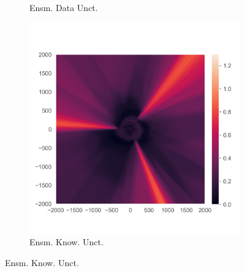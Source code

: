 \begin{figure}
\begin{subfigure}{0.22\textwidth}
  \caption{Ensm. Data Unct.}
  \label{fig:3b}
\end{subfigure}
\begin{subfigure}{0.22\textwidth}
  \centering
  \includegraphics[trim=42 45 15 55, clip, width=\linewidth]{../openreview/plots/3c.png}
  \caption{Ensm. Know. Unct.}
  \label{fig:3c}
\end{subfigure}%


\end{figure}
